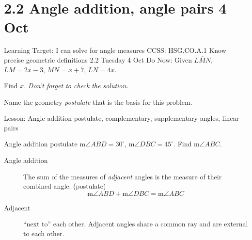 \documentclass[onlytextwidth]{beamer}
\begin{document}
\section{2.2 Angle addition, angle pairs \hfill 4 Oct}
\begin{frame}{Learning Target: I can solve for angle measures}
  {CCSS: HSG.CO.A.1 Know precise geometric definitions \hfill \alert{2.2 Tuesday 4 Oct}}
    Do Now: Given $\overline{LMN}$, $LM=2x-3$, $MN=x+7$, $LN=4x$. \par  
    Find $x$. \hfill \emph{Don't forget to check the solution.} \medskip 
      \begin{flushleft}
      \end{flushleft}
      \vspace{2cm}
    Name the geometry \emph{postulate} that is the basis for this problem. \par \medskip 
    Lesson: Angle addition postulate, complementary, supplementary angles, linear pairs
  \end{frame}

\begin{frame}{Angle addition postulate}
  m$\angle ABD=30^\circ$, m$\angle DBC=45^\circ$. Find m$\angle ABC$. \par \bigskip
     \bigskip
    \begin{description}
      \item[Angle addition] The sum of the measures of \emph{adjacent} angles is the measure of their combined angle. (postulate)
      $$\text{m}\angle ABD + \text{m}\angle DBC = \text{m}\angle ABC$$
      \item[Adjacent] ``next to'' each other. Adjacent angles share a common ray and are external to each other.
    \end{description}
  \end{frame}
\end{document}
